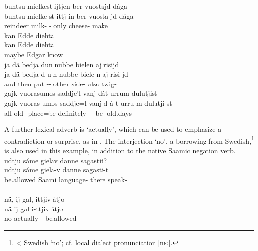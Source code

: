 \ea\label{ADVsEx1}%
\glll	buhtsu mielkest ijtjen ber vuostajd dága\\
	buhtsu mielke-st ittj-in ber vuosta-jd dága\\
	reindeer\BS{} milk- - only cheese- make\BS{}\\\nopagebreak
	
\z
\ea\label{ADVsEx3}%
\glll	kan Edde diehta\\
	kan Edde diehta\\
	maybe Edgar\BS{} know\BS{}\\\nopagebreak
{}	
\z
\ea\label{ADVsEx3b}%
\glll	ja dä bedja dun nubbe bielen aj risijd\\
	ja dä bedja d-u-n nubbe biele-n aj risi-jd\\
	and then put\BS{} -- other side- also twig-\\\nopagebreak
{}	
\z
\ea\label{ADVsEx5}
\glll	gajk vuorasumos saddje'l vanj dát urrum dulutjist\\
	gajk vuoras-umos saddje=l vanj d-á-t urru-m dulutji-st\\
	all old- place\BS{}=be\BS{} definitely -- be- old.days-\\\nopagebreak
{}	
\z

A further lexical adverb is  ‘actually’, which can be used to emphasize a contradiction or surprise, as in . The interjection  ‘no’, a borrowing from Swedish,\footnote{< Swedish  ‘no’; cf. local dialect pronunciation [nɛː].} 
is also used in this example, in addition to the native Saamic negation verb. 
\ea\label{particleEx6}
\glll	{} udtju sáme gielav danne sagastit?\\
	{} udtju sáme giela-v danne sagasti-t\\
	{} be.allowed\BS{} Saami\BS{} language- there speak-\\\nopagebreak
{}\\
\glll	{} nä, ij gal, ittjiv åtjo\\
	{} nä ij gal i-ttjiv åtjo\\
	{} no \BS{} actually - be.allowed\BS{}\\\nopagebreak
{}	
\z

